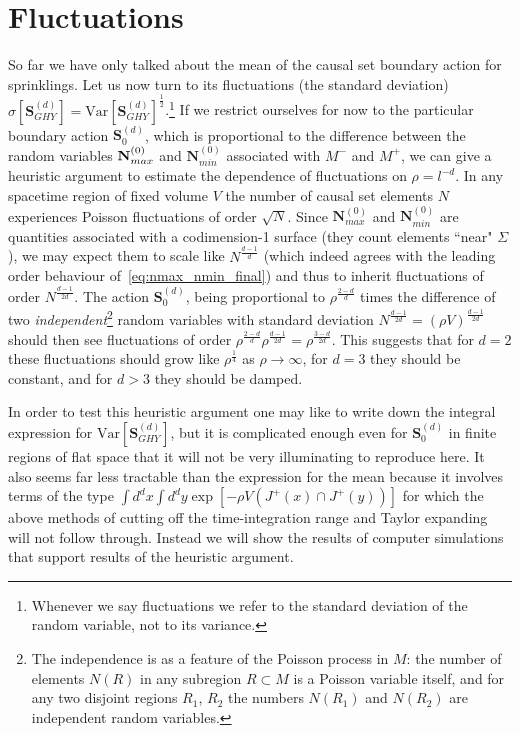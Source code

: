 \documentclass[12pt]{article}
\begin{document}
\section{Fluctuations}
So far we have only talked about the mean of the causal set boundary action for sprinklings. Let us now turn to its fluctuations (the standard deviation) $\sigma[\mathbf S^{(d)}_{GHY}]=\text{Var}[\mathbf S^{(d)}_{GHY}]^\frac12$.\footnote{Whenever we say fluctuations we refer to the standard deviation of the random variable, not to its variance.} If we restrict ourselves for now to the particular boundary action $\mathbf S^{(d)}_{0}$, which is proportional to the difference between the random variables $\mathbf N^{(0)}_{\vphantom{i}max}$ and $\mathbf N_{min}^{(0)}$ associated with $M^-$ and $M^+$, we can give a heuristic argument to estimate the dependence of fluctuations on $\rho=l^{-d}$. In any spacetime region of fixed volume $V$ the number of causal set elements $N$ experiences Poisson fluctuations of order $\sqrt N$. Since $\mathbf N_{max}^{(0)}$ and $\mathbf N_{min}^{(0)}$ are quantities associated with a codimension-1 surface (they count elements ``near" $\Sigma$), we may expect them to scale like $N^\frac{d-1}{d}$ (which indeed agrees with the leading order behaviour of~\eqref{eq:nmax_nmin_final}) and thus to inherit fluctuations of order $N^\frac{d-1}{2d}$. 
The action $\mathbf S^{(d)}_{0}$, being proportional to $\rho^\frac{2-d}{d}$ times the difference of two \emph{independent}\footnote{The independence is as a feature of the Poisson process in $M$: the number of elements $N(R)$ in any subregion $R\subset M$ is a Poisson variable itself, and for any two disjoint regions $R_1$, $R_2$ the numbers $N(R_1)$ and $N(R_2)$ are independent random variables.} random variables with standard deviation $N^\frac{d-1}{2d} = (\rho V)^\frac{d-1}{2d}$ should then see fluctuations of order $\rho^\frac{2-d}{d}\rho^\frac{d-1}{2d}=\rho^\frac{3-d}{2d}$. This suggests that for $d=2$ these fluctuations should grow like $\rho^{\frac{1}{4}}$ as $\rho\rightarrow\infty$, for $d=3$ they should be constant, and for $d>3$ they should be damped.

In order to test this heuristic argument one may like to write down the integral expression for $\text{Var}[\mathbf S^{(d)}_{GHY}]$, but it is complicated enough even for $\mathbf S^{(d)}_0$ in finite regions of flat space that it will not be very illuminating to reproduce here. It also seems far less tractable than the expression for the mean because it involves terms of the type $\int d^dx\int d^dy \exp\left[-\rho V(J^+(x)\cap J^+(y))\right]$ for which the above methods of cutting off the time-integration range and Taylor expanding will not follow through. Instead we will show the results of computer simulations that support results of the heuristic argument. 
\end{document}
